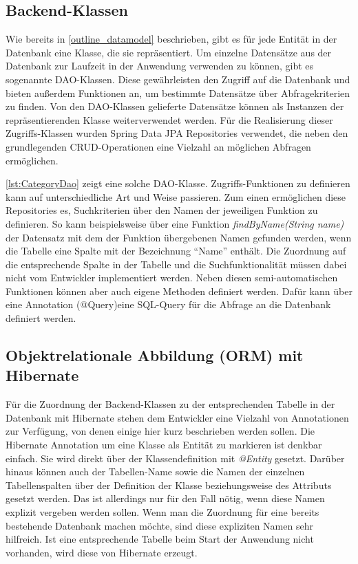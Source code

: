 \subsection{Backend-Klassen}
Wie bereits in \cref{outline_datamodel} beschrieben, gibt es für jede Entität in der Datenbank eine Klasse, die sie repräsentiert.
Um einzelne Datensätze aus der Datenbank zur Laufzeit in der Anwendung verwenden zu können, gibt es sogenannte \acs{DAO}-Klassen.
Diese gewährleisten den Zugriff auf die Datenbank und bieten außerdem Funktionen an, um bestimmte Datensätze über Abfragekriterien zu finden.
Von den \acs{DAO}-Klassen gelieferte Datensätze können als Instanzen der repräsentierenden Klasse weiterverwendet werden.
Für die Realisierung dieser Zugriffs-Klassen wurden Spring Data \acs{JPA} Repositories verwendet, die neben den grundlegenden \acs{CRUD}-Operationen eine Vielzahl an möglichen Abfragen ermöglichen.



\cref{lst:CategoryDao} zeigt eine solche \acs{DAO}-Klasse.
Zugriffs-Funktionen zu definieren kann auf unterschiedliche Art und Weise passieren. Zum einen ermöglichen diese Repositories es, Suchkriterien über den Namen der jeweiligen Funktion zu definieren.
So kann beispielsweise über eine Funktion \textit{findByName(String name)} der Datensatz mit dem der Funktion übergebenen Namen gefunden werden, wenn die Tabelle eine Spalte mit der Bezeichnung \enquote{Name} enthält. Die Zuordnung auf die entsprechende Spalte in der Tabelle und die Suchfunktionalität müssen dabei nicht vom Entwickler implementiert werden.
Neben diesen semi-automatischen Funktionen können aber auch eigene Methoden definiert werden. Dafür kann über eine Annotation (@Query)eine \acs{SQL}-Query für die Abfrage an die Datenbank definiert werden.

\subsection{Objektrelationale Abbildung (\acs{ORM}) mit Hibernate}
Für die Zuordnung der Backend-Klassen zu der entsprechenden Tabelle in der Datenbank mit Hibernate stehen dem Entwickler eine Vielzahl von Annotationen zur Verfügung, von denen einige hier kurz beschrieben werden sollen.
Die Hibernate Annotation um eine Klasse als Entität zu markieren ist denkbar einfach. Sie wird direkt über der Klassendefinition mit \textit{@Entity} gesetzt.
Darüber hinaus können auch der Tabellen-Name sowie die Namen der einzelnen Tabellenspalten über der Definition der Klasse beziehungsweise des Attributs gesetzt werden. Das ist allerdings nur für den Fall nötig, wenn diese Namen explizit vergeben werden sollen.
Wenn man die Zuordnung für eine bereits bestehende Datenbank machen möchte, sind diese expliziten Namen sehr hilfreich.
Ist eine entsprechende Tabelle beim Start der Anwendung nicht vorhanden, wird diese von Hibernate erzeugt.

